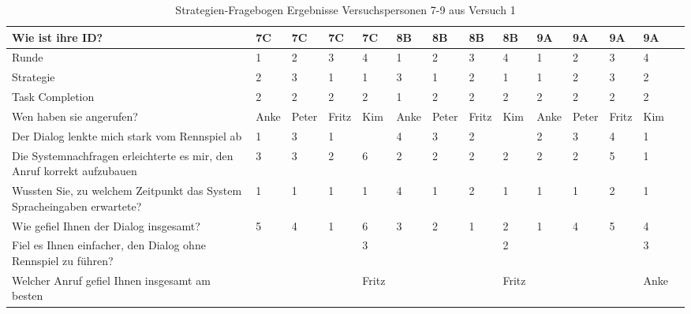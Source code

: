 \documentclass[12pt,a4paper]{scrartcl}
\begin{document}
\begin{appendix}
\begin{table}
\caption{Strategien-Fragebogen Ergebnisse Versuchspersonen 7-9 aus Versuch 1}
\begin{tabular}{|p{6cm}| p{0.8cm} | p{0.8cm} | p{0.8cm} | p{0.8cm} || p{0.8cm} | p{0.8cm} | p{0.8cm} | p{0.8cm} || p{0.8cm} | p{0.8cm} | p{0.8cm} | p{0.8cm} | p{} | }
\hline
	Wie ist ihre ID? & 7C & 7C & 7C & 7C & 8B & 8B & 8B & 8B & 9A & 9A & 9A & 9A \\ \hline \hline
	Runde & 1 & 2 & 3 & 4 & 1 & 2 & 3 & 4 & 1 & 2 & 3 & 4 \\ \hline
	Strategie & 2 & 3 & 1 & 1 & 3 & 1 & 2 & 1 & 1 & 2 & 3 & 2 \\ \hline \hline
	Task Completion & 2 & 2 & 2 & 2 & 1 & 2 & 2 & 2 & 2 & 2 & 2 & 2 \\ \hline \hline
	Wen haben sie angerufen? & Anke & Peter & Fritz & Kim & Anke & Peter & Fritz & Kim & Anke & Peter & Fritz & Kim \\ \hline
	Der Dialog lenkte mich stark vom Rennspiel ab & 1 & 3 & 1 &  & 4 & 3 & 2 &  & 2 & 3 & 4 & 1 \\ \hline
	Die Systemnachfragen erleichterte es mir, den Anruf korrekt aufzubauen & 3 & 3 & 2 & 6 & 2 & 2 & 2 & 2 & 2 & 2 & 5 & 1 \\ \hline
	Wussten Sie, zu welchem Zeitpunkt das System Spracheingaben erwartete? & 1 & 1 & 1 & 1 & 4 & 1 & 2 & 1 & 1 & 1 & 2 & 1 \\ \hline
	Wie gefiel Ihnen der Dialog insgesamt? & 5 & 4 & 1 & 6 & 3 & 2 & 1 & 2 & 1 & 4 & 5 & 4 \\ \hline
	Fiel es Ihnen einfacher, den Dialog ohne Rennspiel zu führen? &  &  &  & 3 &  &  &  & 2 &  &  &  & 3 \\ \hline
	Welcher Anruf gefiel Ihnen insgesamt am besten &  &  &  & Fritz &  &  &  & Fritz &  &  &  & Anke \\ \hline
\end{tabular}
\end{table}


\end{appendix}
\end{document}
